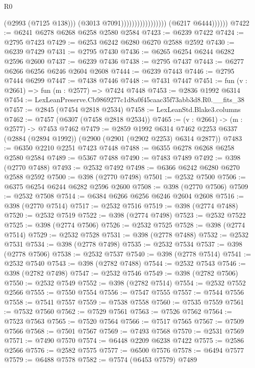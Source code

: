 \begin{lexlean}{R0}
\begin{coremodule}
                                                (@2993 (@7125 @138)))
                                              (@3013 @7091)))))))))))))))))
              (@6217 @6444))))))
@7422 := @6241 @6278 @6268 @6258 @2580 @2584
@7423 := @6239 @7422
@7424 := @2795 @7423
@7429 := @6253 @6242 @6280 @6270 @2588 @2592
@7430 := @6239 @7429
@7431 := @2795 @7430
@7436 := @6265 @6254 @6244 @6282 @2596 @2600
@7437 := @6239 @7436
@7438 := @2795 @7437
@7443 := @6277 @6266 @6256 @6246 @2604 @2608
@7444 := @6239 @7443
@7446 := @2795 @7444 @6299
@7447 := @7438 @7446
@7448 := @7431 @7447
@7451 := fun (v : @2661) => fun (m : @2577) => @7424 @7448
@7453 := @2836 @1992 @6314
@7454 := LexLeanPreserve.Cb9869277c1d8a0f45caac35f73abb3d8.R0.__fits_38
@7457 := @2845 (@7454 @2818 @2534)
@7458 := LexLeanStd.Blake3.columns
@7462 := @7457 (@6307 (@7458 @2818 @2534))
@7465 := (v : @2661) -> (m : @2577) -> @7453 @7462
@7479 := @2859
    @1992
    @6314
    @7462
    @2253
    @6337
    (@2884 (@2894 @1992))
    (@2900 (@2901 (@2902 @2253) @6314 @2877))
@7483 := @6350 @2210 @2251 @7423 @7448
@7488 := @6355 @6278 @6268 @6258 @2580 @2584
@7489 := @5367 @7488
@7490 := @7483 @7489
@7492 := @398 (@2770 @7488)
@7493 := @2532 @7492
@7498 := @6366 @6242 @6280 @6270 @2588 @2592
@7500 := @398 (@2770 @7498)
@7501 := @2532 @7500
@7506 := @6375 @6254 @6244 @6282 @2596 @2600
@7508 := @398 (@2770 @7506)
@7509 := @2532 @7508
@7514 := @6384 @6266 @6256 @6246 @2604 @2608
@7516 := @398 (@2770 @7514)
@7517 := @2532 @7516
@7519 := @398 (@2774 @7488)
@7520 := @2532 @7519
@7522 := @398 (@2774 @7498)
@7523 := @2532 @7522
@7525 := @398 (@2774 @7506)
@7526 := @2532 @7525
@7528 := @398 (@2774 @7514)
@7529 := @2532 @7528
@7531 := @398 (@2778 @7488)
@7532 := @2532 @7531
@7534 := @398 (@2778 @7498)
@7535 := @2532 @7534
@7537 := @398 (@2778 @7506)
@7538 := @2532 @7537
@7540 := @398 (@2778 @7514)
@7541 := @2532 @7540
@7543 := @398 (@2782 @7488)
@7544 := @2532 @7543
@7546 := @398 (@2782 @7498)
@7547 := @2532 @7546
@7549 := @398 (@2782 @7506)
@7550 := @2532 @7549
@7552 := @398 (@2782 @7514)
@7554 := @2532 @7552 @2566
@7555 := @7550 @7554
@7556 := @7547 @7555
@7557 := @7544 @7556
@7558 := @7541 @7557
@7559 := @7538 @7558
@7560 := @7535 @7559
@7561 := @7532 @7560
@7562 := @7529 @7561
@7563 := @7526 @7562
@7564 := @7523 @7563
@7565 := @7520 @7564
@7566 := @7517 @7565
@7567 := @7509 @7566
@7568 := @7501 @7567
@7569 := @7493 @7568
@7570 := @2531 @7569
@7571 := @7490 @7570
@7574 := @6448 @2209 @6238 @7422
@7575 := @2586 @2566
@7576 := @2582 @7575
@7577 := @6500 @7576
@7578 := @6494 @7577
@7579 := @6488 @7578
@7582 := @7574 (@6453 @7579) @7489

\end{coremodule}
\end{lexlean}
